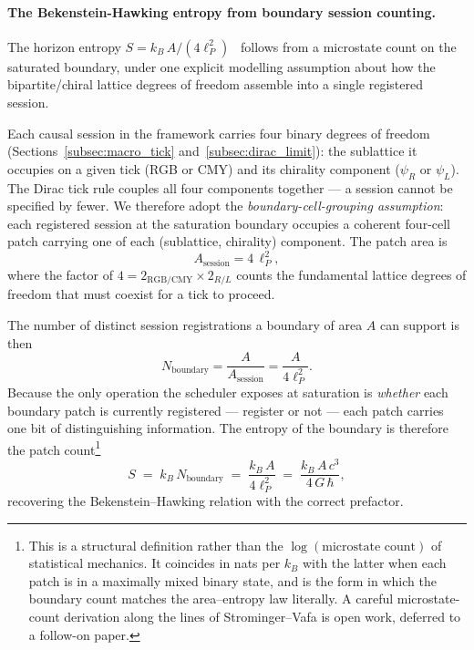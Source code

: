 \paragraph{The Bekenstein-Hawking entropy from boundary session counting.}
The horizon entropy
$S = k_B\,A/(4\ell_P^2)$~\cite{bekenstein1973,hawking1975}
follows from a microstate count on the saturated boundary, under one
explicit modelling assumption about how the bipartite/chiral lattice
degrees of freedom assemble into a single registered session.

Each causal session in the framework carries four binary degrees of
freedom (Sections~\ref{subsec:macro_tick} and~\ref{subsec:dirac_limit}):
the sublattice it occupies on a given tick (RGB or CMY) and its
chirality component ($\psi_R$ or $\psi_L$).  The Dirac tick rule
couples all four components together --- a session cannot be
specified by fewer.  We therefore adopt the
\emph{boundary-cell-grouping assumption}: each registered session at
the saturation boundary occupies a coherent four-cell patch carrying
one of each (sublattice, chirality) component.  The patch area is
\begin{equation}
    A_\text{session} = 4\,\ell_P^2,
    \label{eq:session_patch}
\end{equation}
where the factor of $4 = 2_\text{RGB/CMY}\times 2_{R/L}$ counts the
fundamental lattice degrees of freedom that must coexist for a tick to
proceed.

The number of distinct session registrations a boundary of area $A$
can support is then
\begin{equation}
    N_\text{boundary} = \frac{A}{A_\text{session}} = \frac{A}{4\ell_P^2}.
    \label{eq:N_boundary}
\end{equation}
Because the only operation the scheduler exposes at saturation is
\emph{whether} each boundary patch is currently registered ---
register or not --- each patch carries one bit of distinguishing
information.  The entropy of the boundary is therefore the patch
count\footnote{This is a structural definition rather than the
$\log(\text{microstate count})$ of statistical mechanics.  It coincides
in nats per $k_B$ with the latter when each patch is in a maximally
mixed binary state, and is the form in which the boundary count
matches the area--entropy law literally.  A careful microstate-count
derivation along the lines of Strominger--Vafa is open work, deferred
to a follow-on paper.}
\begin{equation}
    S \;=\; k_B\,N_\text{boundary} \;=\; \frac{k_B\,A}{4\ell_P^2}
        \;=\; \frac{k_B\,A\,c^3}{4\,G\,\hbar},
    \label{eq:bekenstein}
\end{equation}
recovering the Bekenstein--Hawking relation with the correct
prefactor.

